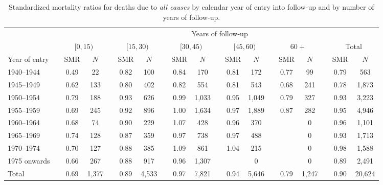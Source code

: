 \documentclass[]{article}
\begin{document}
\begin{table}[H]
\centering
\caption{Standardized mortality ratios for deaths due to \emph{all causes} by calendar year of entry into follow-up and by number of years of follow-up.} 
\begin{tabular}{llcclcclcclcclcclcc}
  \hline & &\multicolumn{17}{c}{Years of follow-up} \\ 
& &\multicolumn{2}{c}{$[0, 15)$} && \multicolumn{2}{c}{$[15, 30)$} && \multicolumn{2}{c}{$[30, 45)$} && \multicolumn{2}{c}{$[45, 60)$} && \multicolumn{2}{c}{$60+$}&& \multicolumn{2}{c}{Total} \\ 
 \cline{3-4}\cline{6-7}\cline{9-10}\cline{12-13}\cline{15-16}\cline{18-19} 
Year of entry &   & SMR & $N$ &   & SMR & $N$ &   & SMR & $N$ &   & SMR & $N$ &   & SMR & $N$ &   & SMR & $N$ \\ 
  \midrule
1940--1944 &  & 0.49 & 22 &  & 0.82 & 100 &  & 0.84 & 170 &  & 0.81 & 172 &  & 0.77 & 99 &  & 0.79 & 563 \\ 
  1945--1949 &  & 0.62 & 133 &  & 0.80 & 402 &  & 0.82 & 554 &  & 0.81 & 543 &  & 0.68 & 241 &  & 0.78 & 1,873 \\ 
  1950--1954 &  & 0.79 & 188 &  & 0.93 & 626 &  & 0.99 & 1,033 &  & 0.95 & 1,049 &  & 0.79 & 327 &  & 0.93 & 3,223 \\ 
  1955--1959 &  & 0.69 & 245 &  & 0.92 & 896 &  & 1.00 & 1,634 &  & 0.97 & 1,889 &  & 0.87 & 282 &  & 0.95 & 4,946 \\ 
  1960--1964 &  & 0.68 & 74 &  & 0.90 & 229 &  & 1.07 & 428 &  & 0.96 & 370 &  &  & 0 &  & 0.96 & 1,101 \\ 
  1965--1969 &  & 0.74 & 128 &  & 0.87 & 359 &  & 0.97 & 738 &  & 0.97 & 488 &  &  & 0 &  & 0.93 & 1,713 \\ 
  1970--1974 &  & 0.70 & 127 &  & 0.88 & 385 &  & 1.09 & 861 &  & 1.04 & 215 &  &  & 0 &  & 0.98 & 1,588 \\ 
  1975 onwards &  & 0.66 & 267 &  & 0.88 & 917 &  & 0.96 & 1,307 &  &  & 0 &  &  & 0 &  & 0.89 & 2,491 \\ 
  Total &  & 0.69 & 1,377 &  & 0.89 & 4,533 &  & 0.97 & 7,821 &  & 0.94 & 5,646 &  & 0.79 & 1,247 &  & 0.90 & 20,624 \\ 
   \bottomrule
\end{tabular}
\end{table}

\pagebreak
\vspace*{1cm}
\end{document}
